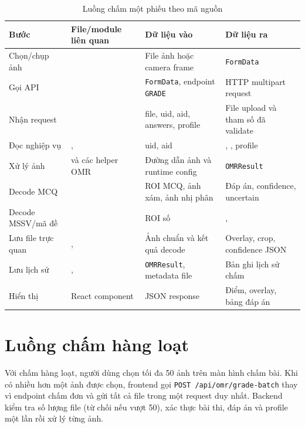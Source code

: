 \begin{longtable}{|L{2.7cm}|L{4.25cm}|L{3.5cm}|L{3.7cm}|}
\caption{Luồng chấm một phiếu theo mã nguồn}
\label{tab:luong-cham-mot-phieu}\\
\hline
\textbf{Bước} & \textbf{File/module liên quan} & \textbf{Dữ liệu vào} & \textbf{Dữ liệu ra} \\
\hline
Chọn/chụp ảnh &  & File ảnh hoặc camera frame & \texttt{FormData} \\
\hline
Gọi API &  & \texttt{FormData}, endpoint \texttt{GRADE} & HTTP multipart request \\
\hline
Nhận request &  & file, uid, aid, answers, profile & File upload và tham số đã validate \\
\hline
Đọc nghiệp vụ & ,  & uid, aid & , , profile \\
\hline
Xử lý ảnh &  và các helper OMR & Đường dẫn ảnh và runtime config & \texttt{OMRResult} \\
\hline
Decode MCQ &  & ROI MCQ, ảnh xám, ảnh nhị phân & Đáp án, confidence, uncertain \\
\hline
Decode MSSV/mã đề &  & ROI số & ,  \\
\hline
Lưu file trực quan & ,  & Ảnh chuẩn và kết quả decode & Overlay, crop, confidence JSON \\
\hline
Lưu lịch sử & ,  & \texttt{OMRResult}, metadata file & Bản ghi lịch sử chấm \\
\hline
Hiển thị & React component & JSON response & Điểm, overlay, bảng đáp án \\
\hline
\end{longtable}

\section{Luồng chấm hàng loạt}

Với chấm hàng loạt, người dùng chọn tối đa 50 ảnh trên màn hình chấm bài. Khi có nhiều hơn một ảnh được chọn, frontend gọi \texttt{POST /api/omr/grade-batch} thay vì endpoint chấm đơn và gửi tất cả file trong một request duy nhất. Backend kiểm tra số lượng file (từ chối nếu vượt 50), xác thực bài thi, đáp án và profile một lần rồi xử lý từng ảnh.

